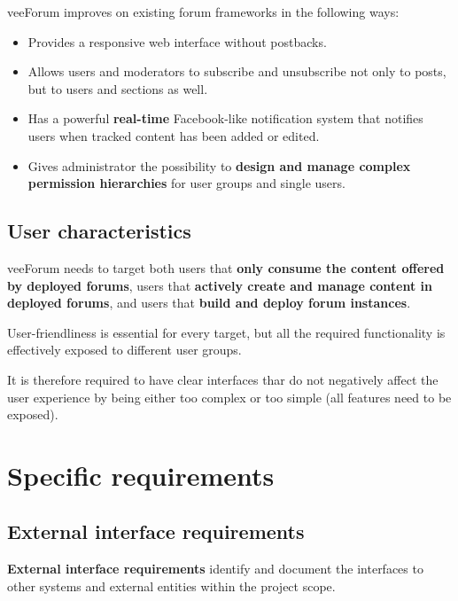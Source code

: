 \documentclass[12pt]{report}
\renewcommand\emph{\textbf}
\begin{document}
                    veeForum improves on existing forum frameworks in the following ways:

                    \begin{itemize}
                        \item Provides a responsive web interface without postbacks.
                        \item Allows users and moderators to subscribe and unsubscribe not only to posts, but to users and sections as well.
                        \item Has a powerful \emph{real-time} Facebook-like notification system that notifies users when tracked content has been added or edited.
                        \item Gives administrator the possibility to \emph{design and manage complex permission hierarchies} for user groups and single users.
                    \end{itemize}

                \subsection{User characteristics}
                    veeForum needs to target both users that \emph{only consume the content offered by deployed forums}, users that \emph{actively create and manage content in deployed forums}, and users that \emph{build and deploy forum instances}.

                    User-friendliness is essential for every target, but all the required functionality is effectively exposed to different user groups.

                    It is therefore required to have clear interfaces thar do not negatively affect the user experience by being either too complex or too simple (all features need to be exposed).

            \section{Specific requirements}

                \subsection{External interface requirements}

                    \emph{External interface requirements} identify and document the interfaces to other systems and external entities within the project scope.
\end{document}
